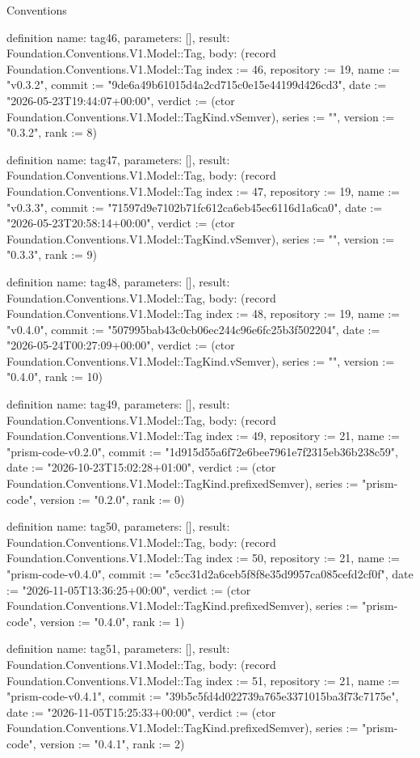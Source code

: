 \begin{lexlean}{Conventions}
\begin{semanticmodule}
definition{
  name: tag46,
  parameters: [],
  result: Foundation.Conventions.V1.Model::Tag,
  body: (record Foundation.Conventions.V1.Model::Tag {index := 46, repository := 19, name := "v0.3.2", commit := "9de6a49b61015d4a2cd715c0e15e44199d426cd3", date := "2026-05-23T19:44:07+00:00", verdict := (ctor Foundation.Conventions.V1.Model::TagKind.vSemver), series := "", version := "0.3.2", rank := 8})
}

definition{
  name: tag47,
  parameters: [],
  result: Foundation.Conventions.V1.Model::Tag,
  body: (record Foundation.Conventions.V1.Model::Tag {index := 47, repository := 19, name := "v0.3.3", commit := "71597d9e7102b71fc612ca6eb45ec6116d1a6ca0", date := "2026-05-23T20:58:14+00:00", verdict := (ctor Foundation.Conventions.V1.Model::TagKind.vSemver), series := "", version := "0.3.3", rank := 9})
}

definition{
  name: tag48,
  parameters: [],
  result: Foundation.Conventions.V1.Model::Tag,
  body: (record Foundation.Conventions.V1.Model::Tag {index := 48, repository := 19, name := "v0.4.0", commit := "507995bab43c0cb06ec244c96e6fc25b3f502204", date := "2026-05-24T00:27:09+00:00", verdict := (ctor Foundation.Conventions.V1.Model::TagKind.vSemver), series := "", version := "0.4.0", rank := 10})
}

definition{
  name: tag49,
  parameters: [],
  result: Foundation.Conventions.V1.Model::Tag,
  body: (record Foundation.Conventions.V1.Model::Tag {index := 49, repository := 21, name := "prism-code-v0.2.0", commit := "1d915d55a6f72e6bee7961e7f2315eb36b238c59", date := "2026-10-23T15:02:28+01:00", verdict := (ctor Foundation.Conventions.V1.Model::TagKind.prefixedSemver), series := "prism-code", version := "0.2.0", rank := 0})
}

definition{
  name: tag50,
  parameters: [],
  result: Foundation.Conventions.V1.Model::Tag,
  body: (record Foundation.Conventions.V1.Model::Tag {index := 50, repository := 21, name := "prism-code-v0.4.0", commit := "c5cc31d2a6ceb5f8f8e35d9957ca085cefd2cf0f", date := "2026-11-05T13:36:25+00:00", verdict := (ctor Foundation.Conventions.V1.Model::TagKind.prefixedSemver), series := "prism-code", version := "0.4.0", rank := 1})
}

definition{
  name: tag51,
  parameters: [],
  result: Foundation.Conventions.V1.Model::Tag,
  body: (record Foundation.Conventions.V1.Model::Tag {index := 51, repository := 21, name := "prism-code-v0.4.1", commit := "39b5c5fd4d022739a765e3371015ba3f73c7175e", date := "2026-11-05T15:25:33+00:00", verdict := (ctor Foundation.Conventions.V1.Model::TagKind.prefixedSemver), series := "prism-code", version := "0.4.1", rank := 2})
}


\end{semanticmodule}
\end{lexlean}
